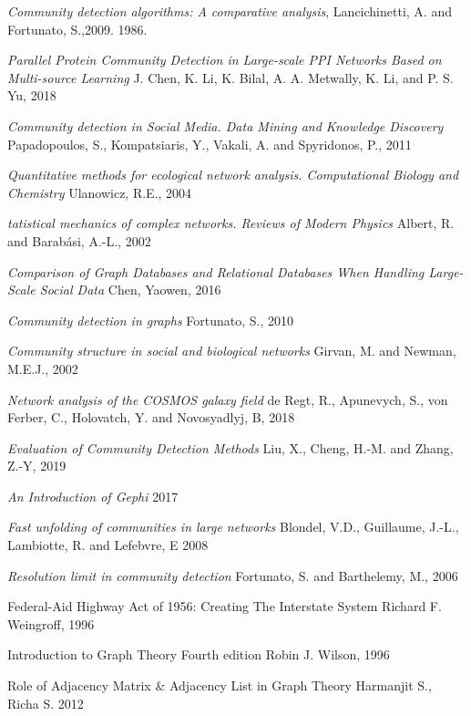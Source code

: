 \documentclass[12pt]{article}
\begin{document}
\pagebreak
\begin{thebibliography}{100}

  
    \textit{Community detection algorithms: A comparative analysis},
    Lancichinetti, A. and Fortunato, S.,2009.
    1986.
  
    \textit{Parallel Protein Community Detection in
    Large-scale PPI Networks Based on
    Multi-source Learning}
    J. Chen, K. Li, K. Bilal, A. A. Metwally, K. Li, and P. S. Yu,
    2018
    
    \textit{Community detection in Social Media. Data Mining and Knowledge Discovery}
    Papadopoulos, S., Kompatsiaris, Y., Vakali, A. and Spyridonos, P.,
    2011
    
    \textit{Quantitative methods for ecological network analysis. Computational Biology and Chemistry}
    Ulanowicz, R.E.,
    2004
    
    \textit{tatistical mechanics of complex networks. Reviews of Modern Physics}
    Albert, R. and Barabási, A.-L.,
    2002
    
    \textit{Comparison of Graph Databases and Relational Databases When Handling Large-Scale Social Data}
    Chen, Yaowen,
    2016
    
    \textit{Community detection in graphs}
    Fortunato, S.,
    2010
    
    \textit{Community structure in social and biological networks}
    Girvan, M. and Newman, M.E.J.,
    2002
    
    \textit{Network analysis of the COSMOS galaxy field}
    de Regt, R., Apunevych, S., von Ferber, C., Holovatch, Y. and Novosyadlyj, B,
    2018
    
    \textit{Evaluation of Community Detection Methods}
    Liu, X., Cheng, H.-M. and Zhang, Z.-Y,
    2019
    
    \textit{An Introduction of Gephi}
    2017

    \textit{Fast unfolding of communities in large networks}
    Blondel, V.D., Guillaume, J.-L., Lambiotte, R. and Lefebvre, E
    2008
    
    \textit{Resolution limit in community detection}
    Fortunato, S. and Barthelemy, M.,
    2006

	{Federal-Aid Highway Act of 1956: Creating The Interstate System}
	Richard F. Weingroff,
    1996
    
   	{Introduction to Graph Theory Fourth edition }
    Robin J. Wilson,
    1996
    
    {Role of Adjacency Matrix & Adjacency List in Graph Theory}
    Harmanjit S., Richa S.
    2012
        
\end{thebibliography}
\end{document}
